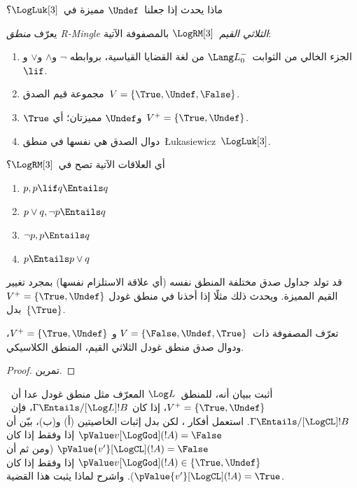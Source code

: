\documentclass[../../../include/open-logic-section]{subfiles}
\begin{document}
ماذا يحدث إذا جعلنا~$\Undef$ مميزة في~$\LogLuk[3]$؟

\begin{defn}
  يعرّف \emph{منطق R-Mingle الثلاثي القيم}~$\LogRM[3]$ بالمصفوفة
  الآتية:
  \begin{enumerate}
    \item الجزء الخالي من الثوابت~$\Lang L_0^{-}$ من لغة القضايا القياسية، بروابطه
    $\lnot$ و$\land$ و$\lor$ و$\lif$.
    \item مجموعة قيم الصدق~$V = \{\True, \Undef, \False\}$.
    \item $\True$ و$\Undef$ مميزتان؛ أي~$V^+ = \{\True, \Undef\}$.
    \item دوال الصدق هي نفسها في منطق~\L ukasiewicz~$\LogLuk[3]$.
  \end{enumerate}
\end{defn}

\begin{prob}
  أي العلاقات الآتية تصح في~$\LogRM[3]$؟
  \begin{enumerate}
    \item $p, p \lif q \Entails q$
    \item $p \lor q, \lnot p \Entails q$
    \item $\lnot p, p \Entails q$
    \item $p \Entails p \lor q$
  \end{enumerate}
\end{prob}

قد تولد جداول صدق مختلفة المنطق نفسه (أي علاقة الاستلزام نفسها) بمجرد
تغيير القيم المميزة. ويحدث ذلك مثلًا إذا أخذنا في منطق غودل
$V^+ = \{\True, \Undef\}$ بدل~$\{\True\}$.

\begin{prop}
  تعرّف المصفوفة ذات~$V = \{\False, \Undef,\True\}$ و
  $V^+=\{\True, \Undef\}$، ودوال صدق منطق غودل الثلاثي القيم، المنطق
  الكلاسيكي.
\end{prop}

\begin{proof}
  تمرين.
\end{proof}

\begin{prob}
  أثبت  ببيان أنه، للمنطق~$\Log L$
  المعرّف مثل منطق غودل عدا أن~$V^+=\{\True,\Undef\}$، إذا كان
  $\Gamma \Entails/[\Log L] !B$، فإن~$\Gamma \Entails/[\LogCL] !B$.
  استعمل أفكار ، لكن بدل إثبات
  الخاصيتين (أ) و(ب)، بيّن أن
  $\pValue v[\LogGod](!A) = \False$ إذا وفقط إذا كان
  $\pValue {v'}[\LogCL](!A) = \False$ (ومن ثم أن
  $\pValue v[\LogGod](!A) \in \{\True,\Undef\}$ إذا وفقط إذا كان
  $\pValue {v'}[\LogCL](!A) = \True$). واشرح لماذا يثبت هذا القضية.
\end{prob}
\end{document}
